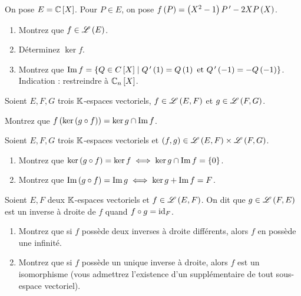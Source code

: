 \begin{exoss}[Exercice 8]
On pose \(E=\poly[\C]\). Pour \(P\in E\), on pose \(f\left(P\right)=\left(X^2-1\right)P^{\,\prime}-2XP\left(X\right)\).

\begin{enumerate}
    \item Montrez que \(f\in\mathscr{L}\left(E\right)\). \\
    \item Déterminez \(\ker f\). \\
    \item Montrez que \(\Im f=\accol{Q\in\poly[C]\tq Q\prim\paren{1}=Q\paren{1}\text{ et }Q\prim\paren{-1}=-Q\paren{-1}}\). Indication : restreindre à \(\polydeg[\C]{n}\).
\end{enumerate}
\end{exoss}



\begin{exos}[Exercice 9]
Soient \(E,F,G\) trois \(\mathbb{K}\)-espaces vectoriels, \(f\in\mathscr{L}\left(E,F\right)\) et \(g\in\mathscr{L}\left(F,G\right)\).

Montrez que \(f\left(\ker\left(g\circ f\right)\right)=\ker g\cap\operatorname{Im} f\).
\end{exos}



\begin{exopss}[Exercice 10]
Soient \(E,F,G\) trois \(\mathbb{K}\)-espaces vectoriels et \(\left(f,g\right)\in\mathscr{L}\left(E,F\right)\times\mathscr{L}\left(F,G\right)\).

\begin{enumerate}
    \item Montrez que \(\ker\left(g\circ f\right)=\ker f\iff\ker g\cap\operatorname{Im} f=\left\lbrace0\right\rbrace\). \\
    \item Montrez que \(\operatorname{Im}\left(g\circ f\right)=\operatorname{Im} g\iff\ker g+\operatorname{Im} f=F\).
\end{enumerate}
\end{exopss}



\begin{exosss}[Exercice 11]
Soient \(E,F\) deux \(\mathbb{K}\)-espaces vectoriels et \(f\in\mathscr{L}\left(E,F\right)\). On dit que \(g\in\mathscr{L}\left(F,E\right)\) est un inverse à droite de \(f\) quand \(f\circ g=\mathrm{id}_{F}\).

\begin{enumerate}
    \item Montrez que si \(f\) possède deux inverses à droite différents, alors \(f\) en possède une infinité. \\
    \item Montrez que si \(f\) possède un unique inverse à droite, alors \(f\) est un isomorphisme (vous admettrez l'existence d'un supplémentaire de tout sous-espace vectoriel).
\end{enumerate}
\end{exosss}



